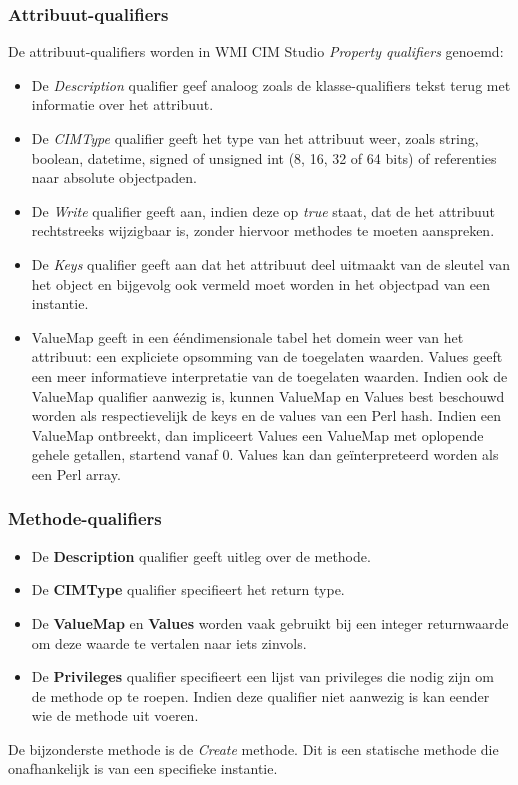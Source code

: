 \documentclass{report}
\begin{document}
	\subsubsection{Attribuut-qualifiers}
	De attribuut-qualifiers worden in WMI CIM Studio \textit{Property qualifiers} genoemd:
	\begin{itemize}
		\item De \textit{Description} qualifier geef analoog zoals de klasse-qualifiers tekst terug met informatie over het attribuut.
		\item De \textit{CIMType} qualifier geeft het type van het attribuut weer, zoals string, boolean, datetime, signed of unsigned int (8, 16, 32 of 64 bits) of referenties naar absolute objectpaden.
		\item De \textit{Write} qualifier geeft aan, indien deze op \textit{true} staat, dat de het attribuut rechtstreeks wijzigbaar is, zonder hiervoor methodes te moeten aanspreken. 
		\item De \textit{Keys} qualifier geeft aan dat het attribuut deel uitmaakt van de sleutel van het object en bijgevolg ook vermeld moet worden in het objectpad van een instantie.
		\item ValueMap geeft in een ééndimensionale tabel het domein weer van het attribuut: een expliciete opsomming van de toegelaten waarden.
			  Values geeft een meer informatieve interpretatie van de toegelaten waarden. Indien ook de ValueMap qualifier aanwezig is, kunnen ValueMap en Values best beschouwd worden als respectievelijk de keys en de values van een Perl hash. Indien een ValueMap ontbreekt, dan impliceert Values een ValueMap met oplopende gehele getallen, startend vanaf 0. Values kan dan geïnterpreteerd worden als een Perl array.
	\end{itemize}
	\subsubsection{Methode-qualifiers}
	\begin{itemize}
		\item De \textbf{Description} qualifier geeft uitleg over de methode.
		\item De \textbf{CIMType} qualifier specifieert het return type.
		\item De \textbf{ValueMap} en \textbf{Values} worden vaak gebruikt bij een integer returnwaarde om deze waarde te vertalen naar iets zinvols.
		\item De \textbf{Privileges} qualifier specifieert een lijst van privileges die nodig zijn om de methode op te roepen. Indien deze qualifier niet aanwezig is kan eender wie de methode uit voeren.
	\end{itemize}
	De bijzonderste methode is de \textit{Create} methode. Dit is een statische methode die onafhankelijk is van een specifieke instantie. 
	
\end{document}
